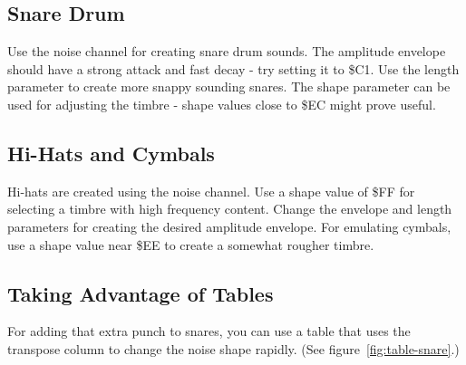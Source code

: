 \subsection{Snare Drum}

Use the noise channel for creating snare drum sounds. The amplitude envelope should have a strong attack and fast decay - try setting it to \$C1. Use the length parameter to create more snappy sounding snares. The shape parameter can be used for adjusting the timbre - shape values close to \$EC might prove useful. 

\subsection{Hi-Hats and Cymbals}

Hi-hats are created using the noise channel. Use a shape value of \$FF for selecting a timbre with high frequency content. Change the envelope and length parameters for creating the desired amplitude envelope. For emulating cymbals, use a shape value near \$EE to create a somewhat rougher timbre.

\subsection{Taking Advantage of Tables}

For adding that extra punch to snares, you can use a table that uses the transpose column to change the noise shape rapidly. (See figure~\ref{fig:table-snare}.) 



